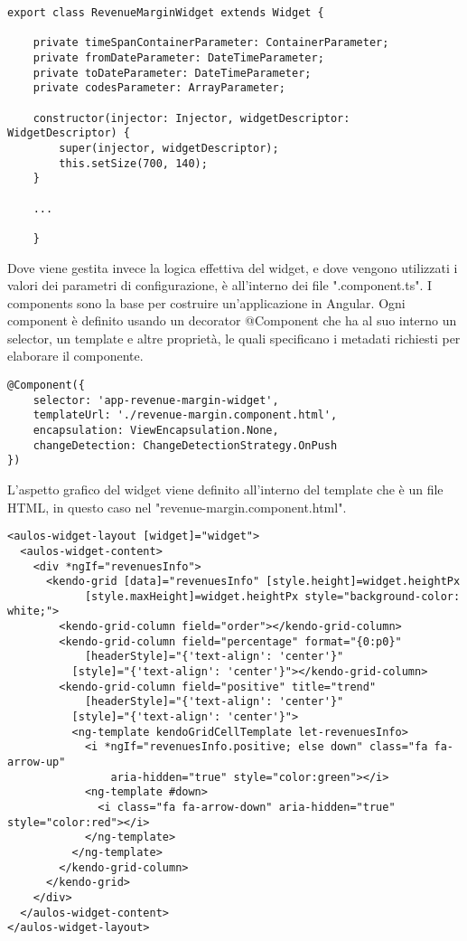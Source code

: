 \begin{lstlisting}[caption={File revenue-margin-widget.ts}, style=javaScriptCode]
export class RevenueMarginWidget extends Widget {

    private timeSpanContainerParameter: ContainerParameter;
    private fromDateParameter: DateTimeParameter;
    private toDateParameter: DateTimeParameter;
    private codesParameter: ArrayParameter;

    constructor(injector: Injector, widgetDescriptor: WidgetDescriptor) {
        super(injector, widgetDescriptor);
        this.setSize(700, 140);
    }
    
    ...
    
    }
\end{lstlisting} 
Dove viene gestita invece la logica effettiva del widget, e dove vengono utilizzati i valori dei parametri di configurazione, è all'interno dei file ".component.ts". I components sono la base per costruire un'applicazione in Angular. Ogni component è definito usando un decorator @Component che ha al suo interno un selector, un template e altre proprietà, le quali specificano i metadati richiesti per elaborare il componente. \\
\begin{lstlisting}[caption={Decorator all'interno del file revenue-margin.component.ts}, style=javaScriptCode]
@Component({
    selector: 'app-revenue-margin-widget',
    templateUrl: './revenue-margin.component.html',
    encapsulation: ViewEncapsulation.None,
    changeDetection: ChangeDetectionStrategy.OnPush
})
\end{lstlisting}
L'aspetto grafico del widget viene definito all'interno del template che è un file HTML, in questo caso nel "revenue-margin.component.html". \\
\begin{lstlisting}[caption={File revenue-margin.component.html}, style=javaScriptCode]
<aulos-widget-layout [widget]="widget">
  <aulos-widget-content>
    <div *ngIf="revenuesInfo">
      <kendo-grid [data]="revenuesInfo" [style.height]=widget.heightPx 
            [style.maxHeight]=widget.heightPx style="background-color: white;">
        <kendo-grid-column field="order"></kendo-grid-column>
        <kendo-grid-column field="percentage" format="{0:p0}" 
            [headerStyle]="{'text-align': 'center'}"
          [style]="{'text-align': 'center'}"></kendo-grid-column>
        <kendo-grid-column field="positive" title="trend" 
            [headerStyle]="{'text-align': 'center'}"
          [style]="{'text-align': 'center'}">
          <ng-template kendoGridCellTemplate let-revenuesInfo>
            <i *ngIf="revenuesInfo.positive; else down" class="fa fa-arrow-up" 
                aria-hidden="true" style="color:green"></i>
            <ng-template #down>
              <i class="fa fa-arrow-down" aria-hidden="true" style="color:red"></i>
            </ng-template>
          </ng-template>
        </kendo-grid-column>
      </kendo-grid>
    </div>
  </aulos-widget-content>
</aulos-widget-layout>
\end{lstlisting}
